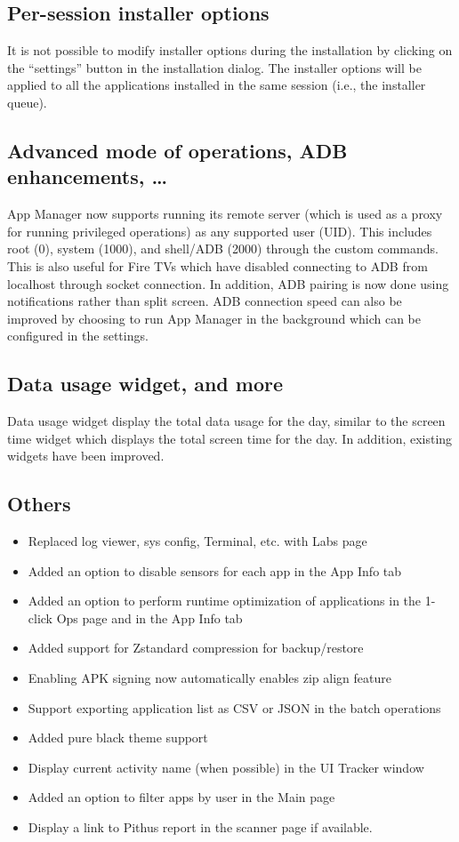\subsection{Per-session installer options}
It is not possible to modify installer options during the installation by clicking on the ``settings''
button in the installation dialog. The installer options will be applied to all the applications
installed in the same session (i.e., the installer queue).

\subsection{Advanced mode of operations, ADB enhancements, \dots}
App Manager now supports running its remote server (which is used as a proxy for running privileged
operations) as any supported user (UID). This includes root (0), system (1000), and shell/ADB (2000)
through the custom commands. This is also useful for Fire TVs which have disabled connecting to ADB
from localhost through socket connection. In addition, ADB pairing is now done using notifications
rather than split screen. ADB connection speed can also be improved by choosing to run App Manager
in the background which can be configured in the settings.

\subsection{Data usage widget, and more}
Data usage widget display the total data usage for the day, similar to the screen time widget which
displays the total screen time for the day. In addition, existing widgets have been improved.

\subsection{Others}
\begin{itemize}
    \item Replaced log viewer, sys config, Terminal, etc. with Labs page
    \item Added an option to disable sensors for each app in the App Info tab
    \item Added an option to perform runtime optimization of applications in the 1-click Ops page
    and in the App Info tab
    \item Added support for Zstandard compression for backup/restore
    \item Enabling APK signing now automatically enables zip align feature
    \item Support exporting application list as CSV or JSON in the batch operations
    \item Added pure black theme support
    \item Display current activity name (when possible) in the UI Tracker window
    \item Added an option to filter apps by user in the Main page
    \item Display a link to Pithus report in the scanner page if available.
\end{itemize}


